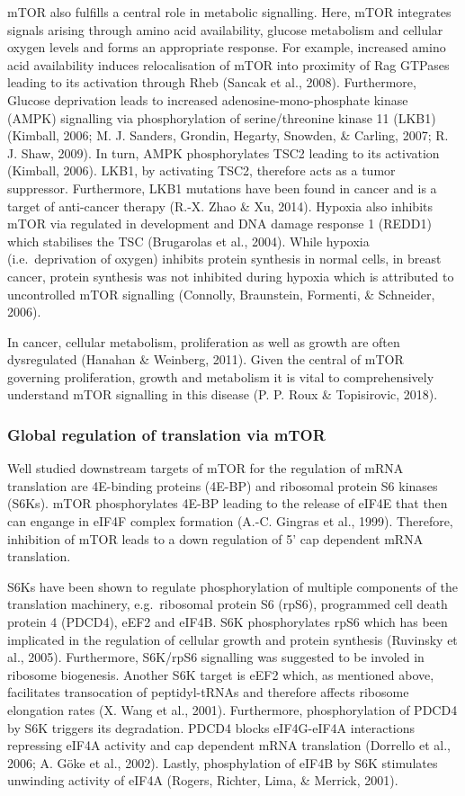 \documentclass[12pt,openany]{book}
\begin{document}
mTOR also fulfills a central role in metabolic signalling. Here, mTOR
integrates signals arising through amino acid availability, glucose
metabolism and cellular oxygen levels and forms an appropriate response.
For example, increased amino acid availability induces relocalisation of
mTOR into proximity of Rag GTPases leading to its activation through
Rheb (Sancak et al., 2008). Furthermore, Glucose deprivation leads to
increased adenosine-mono-phosphate kinase (AMPK) signalling via
phosphorylation of serine/threonine kinase 11 (LKB1) (Kimball, 2006; M.
J. Sanders, Grondin, Hegarty, Snowden, \& Carling, 2007; R. J. Shaw,
2009). In turn, AMPK phosphorylates TSC2 leading to its activation
(Kimball, 2006). LKB1, by activating TSC2, therefore acts as a tumor
suppressor. Furthermore, LKB1 mutations have been found in cancer and is
a target of anti-cancer therapy (R.-X. Zhao \& Xu, 2014). Hypoxia also
inhibits mTOR via regulated in development and DNA damage response 1
(REDD1) which stabilises the TSC (Brugarolas et al., 2004). While
hypoxia (i.e.~deprivation of oxygen) inhibits protein synthesis in
normal cells, in breast cancer, protein synthesis was not inhibited
during hypoxia which is attributed to uncontrolled mTOR signalling
(Connolly, Braunstein, Formenti, \& Schneider, 2006).

In cancer, cellular metabolism, proliferation as well as growth are
often dysregulated (Hanahan \& Weinberg, 2011). Given the central of
mTOR governing proliferation, growth and metabolism it is vital to
comprehensively understand mTOR signalling in this disease (P. P. Roux
\& Topisirovic, 2018).

\subsubsection{Global regulation of translation via mTOR}

Well studied downstream targets of mTOR for the regulation of mRNA
translation are 4E-binding proteins (4E-BP) and ribosomal protein S6
kinases (S6Ks). mTOR phosphorylates 4E-BP leading to the release of
eIF4E that then can engange in eIF4F complex formation (A.-C. Gingras et
al., 1999). Therefore, inhibition of mTOR leads to a down regulation of
5' cap dependent mRNA translation.

S6Ks have been shown to regulate phosphorylation of multiple components
of the translation machinery, e.g.~ribosomal protein S6 (rpS6),
programmed cell death protein 4 (PDCD4), eEF2 and eIF4B. S6K
phosphorylates rpS6 which has been implicated in the regulation of
cellular growth and protein synthesis (Ruvinsky et al., 2005).
Furthermore, S6K/rpS6 signalling was suggested to be involed in ribosome
biogenesis. Another S6K target is eEF2 which, as mentioned above,
facilitates transocation of peptidyl-tRNAs and therefore affects
ribosome elongation rates (X. Wang et al., 2001). Furthermore,
phosphorylation of PDCD4 by S6K triggers its degradation. PDCD4 blocks
eIF4G-eIF4A interactions repressing eIF4A activity and cap dependent
mRNA translation (Dorrello et al., 2006; A. Göke et al., 2002). Lastly,
phosphylation of eIF4B by S6K stimulates unwinding activity of eIF4A
(Rogers, Richter, Lima, \& Merrick, 2001).
\end{document}
